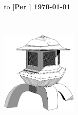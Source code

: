 \begin{titlepage}
\null\vskip-47pt
\hbox to \textwidth
{\bf [Per \holn{} \holnversion] { \hfil \today}}

\setcounter{page}{1}                      %

\vspace*{60mm}


{\selectfont
\begin{center}
 \\
\end{center}}

\begin{center}
\includegraphics[width=3.8cm]{../../../Logo/lantern}
\end{center}


\vfill
\end{titlepage}

\thispagestyle{empty}
\cleardoublepage







